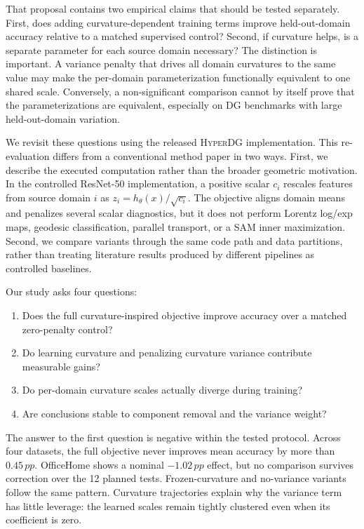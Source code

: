 \documentclass[10pt]{article}
\newcommand{\method}{\textsc{HyperDG}}
\newcommand{\pp}{\,pp}
\begin{document}
That proposal contains two empirical claims that should be tested separately.
First, does adding curvature-dependent training terms improve held-out-domain
accuracy relative to a matched supervised control? Second, if curvature helps,
is a separate parameter for each source domain necessary? The distinction is
important. A variance penalty that drives all domain curvatures to the same
value may make the per-domain parameterization functionally equivalent to one
shared scale. Conversely, a non-significant comparison cannot by itself prove
that the parameterizations are equivalent, especially on DG benchmarks with
large held-out-domain variation.

We revisit these questions using the released \method{} implementation. This
re-evaluation differs from a conventional method paper in two ways. First, we
describe the executed computation rather than the broader geometric
motivation. In the controlled ResNet-50 implementation, a positive scalar
$c_i$ rescales features from source domain $i$ as
$z_i=h_\theta(x)/\sqrt{c_i}$. The objective aligns domain means and penalizes
several scalar diagnostics, but it does not perform Lorentz log/exp maps,
geodesic classification, parallel transport, or a SAM inner maximization.
Second, we compare variants through the same code path and data partitions,
rather than treating literature results produced by different pipelines as
controlled baselines.

Our study asks four questions:
\begin{enumerate}
    \item Does the full curvature-inspired objective improve accuracy over a
          matched zero-penalty control?
    \item Do learning curvature and penalizing curvature variance contribute
          measurable gains?
    \item Do per-domain curvature scales actually diverge during training?
    \item Are conclusions stable to component removal and the variance weight?
\end{enumerate}

The answer to the first question is negative within the tested protocol. Across
four datasets, the full objective never improves mean accuracy by more than
$0.45\pp$. OfficeHome shows a nominal $-1.02\pp$ effect, but no comparison
survives correction over the 12 planned tests. Frozen-curvature and
no-variance variants follow the same pattern. Curvature trajectories explain
why the variance term has little leverage: the learned scales remain tightly
clustered even when its coefficient is zero.
\end{document}
